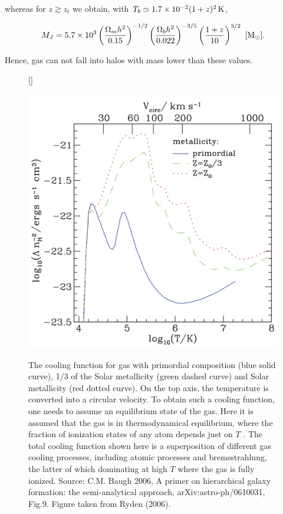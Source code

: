 \documentclass[a4paper,11pt]{article}
\begin{document}
{\noindent}whereas for $z\gtrsim z_t$ we obtain, with $T_b\simeq1.7\times10^{-2}(1+z)^2\,{\rm K}$,

\begin{align*}
    M_J = 5.7\times10^3 \left(\frac{\Omega_mh^2}{0.15}\right)^{-1/2} \left(\frac{\Omega_bh^2}{0.022}\right)^{-3/5}\left(\frac{1+z}{10}\right)^{3/2} ~ [{\rm M_\odot}].
\end{align*}

{\noindent}Hence, gas can not fall into halos with mass lower than these values.

\begin{figure}[t]
    [\FBwidth]
    {\caption{\footnotesize{The cooling function for gas with primordial composition (blue solid curve), 1/3 of the Solar metallicity (green dashed curve) and Solar metallicity (red dotted curve). On the top axis, the temperature is converted into a circular velocity. To obtain such a cooling function, one needs to assume an equilibrium state of the gas. Here it is assumed that the gas is in thermodynamical equilibrium, where the fraction of ionization states of any atom depends just on $T$ . The total cooling function shown here is a superposition of different gas cooling processes, including atomic processes and bremsstrahlung, the latter of which dominating at high $T$ where the gas is fully ionized. Source: C.M. Baugh 2006, A primer on hierarchical galaxy formation: the semi-analytical approach, arXiv:astro-ph/0610031, Fig.9. Figure taken from Ryden (2006).}}
    \label{fig:coolingfunction}}
    {\includegraphics[width=12cm]{figures/CoolingFunction.png}}
\end{figure}
\end{document}
